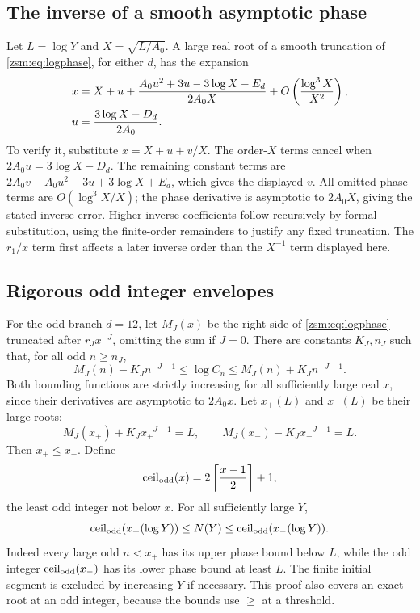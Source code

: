 \documentclass[11pt]{article}
\theoremstyle{definition}\newtheorem{definition}[theorem]{Definition}
\theoremstyle{remark}\newtheorem{remark}[theorem]{Remark}
\newcommand{\ceilodd}{\operatorname{ceil}_{\rm odd}}
\begin{document}
\subsection{The inverse of a smooth asymptotic phase}
Let $L=\log Y$ and $X=\sqrt{L/A_0}$. A large real root of a smooth truncation of
\eqref{zsm:eq:logphase}, for either $d$, has the expansion
\begin{align}
 x={}&X+u+
 \frac{A_0u^2+3u-3\log X-E_d}{2A_0X}
 +O\left(\frac{\log^3X}{X^2}\right),\label{zsm:eq:smoothinverse}\\
 u={}&\frac{3\log X-D_d}{2A_0}.\notag
\end{align}
To verify it, substitute $x=X+u+v/X$. The order-$X$ terms cancel when
$2A_0u=3\log X-D_d$. The remaining constant terms are
$2A_0v-A_0u^2-3u+3\log X+E_d$, which gives the displayed $v$. All omitted
phase terms are $O(\log^3X/X)$; the phase derivative is asymptotic to
$2A_0X$, giving the stated inverse error. Higher inverse coefficients follow
recursively by formal substitution, using the finite-order remainders to
justify any fixed truncation. The $r_1/x$ term first affects a later inverse
order than the $X^{-1}$ term displayed here.

\subsection{Rigorous odd integer envelopes}
For the odd branch $d=12$, let $M_J(x)$ be the right side of
\eqref{zsm:eq:logphase} truncated after $r_Jx^{-J}$, omitting the sum if $J=0$.
There are constants $K_J,n_J$ such that, for all odd $n\ge n_J$,
\begin{equation}\label{zsm:eq:phasebounds}
 M_J(n)-K_Jn^{-J-1}\le\log C_n\le M_J(n)+K_Jn^{-J-1}.
\end{equation}
Both bounding functions are strictly increasing for all sufficiently large
real $x$, since their derivatives are asymptotic to $2A_0x$. Let $x_+(L)$ and
$x_-(L)$ be their large roots:
\[
 M_J(x_+)+K_Jx_+^{-J-1}=L,\qquad
 M_J(x_-)-K_Jx_-^{-J-1}=L.
\]
Then $x_+\le x_-$. Define
\[
 \ceilodd(x)=2\left\lceil\frac{x-1}2\right\rceil+1,
\]
the least odd integer not below $x$. For all sufficiently large $Y$,
\begin{equation}\label{zsm:eq:oddenvelope}
 \ceilodd(x_+(\log Y))\le N(Y)\le\ceilodd(x_-(\log Y)).
\end{equation}
Indeed every large odd $n<x_+$ has its upper phase bound below $L$, while the
odd integer $\ceilodd(x_-)$ has its lower phase bound at least $L$. The finite
initial segment is excluded by increasing $Y$ if necessary. This proof also
covers an exact root at an odd integer, because the bounds use $\ge$ at a
threshold.
\end{document}
